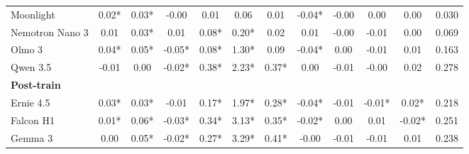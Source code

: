 \begin{table}[p]
\begin{tabular}{lccccccccccr}
Moonlight & \cellcolor[HTML]{C9EEDB}0.02* & \cellcolor[HTML]{C5EDD8}0.03* & \cellcolor[HTML]{FEF8F8}-0.00 & \cellcolor[HTML]{FCFEFD}0.01 & \cellcolor[HTML]{FBFEFC}0.06 & \cellcolor[HTML]{FCFEFD}0.01 & \cellcolor[HTML]{F5B8B1}-0.04* & \cellcolor[HTML]{FFFCFC}-0.00 & \cellcolor[HTML]{FCFEFD}0.00 & \cellcolor[HTML]{DCF4E7}0.00 & 0.030 \\
Nemotron Nano 3 & \cellcolor[HTML]{ECF9F2}0.01 & \cellcolor[HTML]{C5EDD8}0.03* & \cellcolor[HTML]{F0FAF5}0.01 & \cellcolor[HTML]{DFF5EA}0.08* & \cellcolor[HTML]{F2FBF7}0.20* & \cellcolor[HTML]{F6FCF9}0.02 & \cellcolor[HTML]{E5F7EE}0.01 & \cellcolor[HTML]{FCE6E4}-0.00 & \cellcolor[HTML]{F2A098}-0.01 & \cellcolor[HTML]{E8F8EF}0.00 & 0.069 \\
Olmo 3 & \cellcolor[HTML]{9AE0BB}0.04* & \cellcolor[HTML]{A5E3C3}0.05* & \cellcolor[HTML]{F4AEA7}-0.05* & \cellcolor[HTML]{DCF4E8}0.08* & \cellcolor[HTML]{ACE5C8}1.30* & \cellcolor[HTML]{D9F3E5}0.09 & \cellcolor[HTML]{F5B3AD}-0.04* & \cellcolor[HTML]{F1FBF6}0.00 & \cellcolor[HTML]{F3A8A0}-0.01 & \cellcolor[HTML]{83D9AC}0.01 & 0.163 \\
Qwen 3.5 & \cellcolor[HTML]{FCE6E3}-0.01 & \cellcolor[HTML]{FEFFFF}0.00 & \cellcolor[HTML]{FAD6D3}-0.02* & \cellcolor[HTML]{60CE95}0.38* & \cellcolor[HTML]{71D3A0}2.23* & \cellcolor[HTML]{5ACC91}0.37* & \cellcolor[HTML]{F8FDFA}0.00 & \cellcolor[HTML]{F19A91}-0.01 & \cellcolor[HTML]{FAD7D4}-0.00 & \cellcolor[HTML]{35C078}0.02 & 0.278 \\
\midrule
\multicolumn{12}{l}{\textbf{Post-train}} \\
Ernie 4.5 & \cellcolor[HTML]{BBEAD1}0.03* & \cellcolor[HTML]{CCEFDD}0.03* & \cellcolor[HTML]{FDEEEC}-0.01 & \cellcolor[HTML]{B7E9CF}0.17* & \cellcolor[HTML]{81D8AB}1.97* & \cellcolor[HTML]{80D7AA}0.28* & \cellcolor[HTML]{F5B6AF}-0.04* & \cellcolor[HTML]{F3A8A1}-0.01 & \cellcolor[HTML]{EF8479}-0.01* & \cellcolor[HTML]{2EBE73}0.02* & 0.218 \\
Falcon H1 & \cellcolor[HTML]{E0F5EA}0.01* & \cellcolor[HTML]{8DDCB3}0.06* & \cellcolor[HTML]{F9D4D0}-0.03* & \cellcolor[HTML]{71D3A0}0.34* & \cellcolor[HTML]{38C17A}3.13* & \cellcolor[HTML]{61CE95}0.35* & \cellcolor[HTML]{FBE3E1}-0.02* & \cellcolor[HTML]{E4F7ED}0.00 & \cellcolor[HTML]{90DCB4}0.01 & \cellcolor[HTML]{EA5F51}-0.02* & 0.251 \\
Gemma 3 & \cellcolor[HTML]{F4FCF8}0.00 & \cellcolor[HTML]{A8E4C5}0.05* & \cellcolor[HTML]{FCE7E4}-0.02* & \cellcolor[HTML]{8DDCB3}0.27* & \cellcolor[HTML]{2EBE73}3.29* & \cellcolor[HTML]{48C684}0.41* & \cellcolor[HTML]{FEFAFA}-0.00 & \cellcolor[HTML]{F3A59C}-0.01 & \cellcolor[HTML]{F3A8A0}-0.01 & \cellcolor[HTML]{C4EDD7}0.01 & 0.238 \\

\end{tabular}
\end{table}
